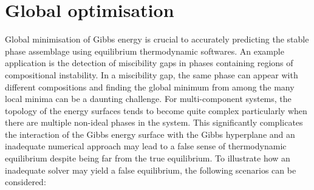	\section{Global optimisation}\label{sec:global_opt_intro}
	 Global minimisation of Gibbs energy is crucial to accurately predicting the stable phase assemblage using equilibrium thermodynamic softwares. An example application is the detection of miscibility gaps in phases containing regions of compositional instability. In a miscibility gap, the same phase can appear with different compositions and finding the global minimum from among the many local minima can be a daunting challenge. For multi-component systems, the topology of the energy surfaces tends to become quite complex particularly when there are multiple non-ideal phases in the system. This significantly complicates the interaction of the Gibbs energy surface with the Gibbs hyperplane and an inadequate numerical approach may lead to a false sense of thermodynamic equilibrium despite being far from the true equilibrium. To illustrate how an inadequate solver may yield a false equilibrium, the following scenarios can be considered:
